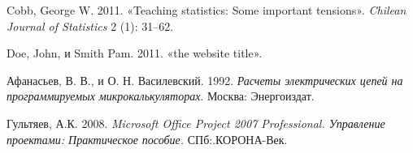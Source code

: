 \documentclass[11pt,russian,]{article}
\begin{document}
\hypertarget{refs}{}
\hypertarget{ref-cobb2011teaching}{}
Cobb, George W. 2011. «Teaching statistics: Some important tensions».
\emph{Chilean Journal of Statistics} 2 (1): 31--62.

\hypertarget{ref-doe:website}{}
Doe, John, и Smith Pam. 2011. «the website title».

\hypertarget{ref-afanasyev92}{}
Афанасьев, В. В., и О. Н. Василевский. 1992. \emph{Расчеты электрических
цепей на программируемых микрокалькуляторах}. Москва: Энергоиздат.

\hypertarget{ref-microsoftProject2008}{}
Гультяев, А.К. 2008. \emph{Microsoft Office Project 2007 Professional.
Управление проектами: Практическое пособие.} СПб:.КОРОНА-Век.
\end{document}
